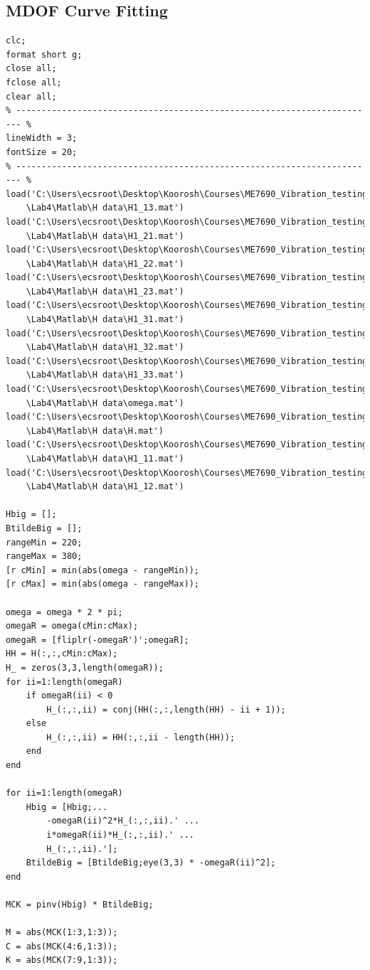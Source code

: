\documentclass[paper=a4, fontsize=12pt]{scrartcl} %
\begin{document}
\subsection*{MDOF Curve Fitting}
\begin{lstlisting}
clc;
format short g;
close all;
fclose all;
clear all;
% ----------------------------------------------------------------------- %
lineWidth = 3;
fontSize = 20;
% ----------------------------------------------------------------------- %
load('C:\Users\ecsroot\Desktop\Koorosh\Courses\ME7690_Vibration_testing
	\Lab4\Matlab\H data\H1_13.mat')
load('C:\Users\ecsroot\Desktop\Koorosh\Courses\ME7690_Vibration_testing
	\Lab4\Matlab\H data\H1_21.mat')
load('C:\Users\ecsroot\Desktop\Koorosh\Courses\ME7690_Vibration_testing
	\Lab4\Matlab\H data\H1_22.mat')
load('C:\Users\ecsroot\Desktop\Koorosh\Courses\ME7690_Vibration_testing
	\Lab4\Matlab\H data\H1_23.mat')
load('C:\Users\ecsroot\Desktop\Koorosh\Courses\ME7690_Vibration_testing
	\Lab4\Matlab\H data\H1_31.mat')
load('C:\Users\ecsroot\Desktop\Koorosh\Courses\ME7690_Vibration_testing
	\Lab4\Matlab\H data\H1_32.mat')
load('C:\Users\ecsroot\Desktop\Koorosh\Courses\ME7690_Vibration_testing
	\Lab4\Matlab\H data\H1_33.mat')
load('C:\Users\ecsroot\Desktop\Koorosh\Courses\ME7690_Vibration_testing
	\Lab4\Matlab\H data\omega.mat')
load('C:\Users\ecsroot\Desktop\Koorosh\Courses\ME7690_Vibration_testing
	\Lab4\Matlab\H data\H.mat')
load('C:\Users\ecsroot\Desktop\Koorosh\Courses\ME7690_Vibration_testing
	\Lab4\Matlab\H data\H1_11.mat')
load('C:\Users\ecsroot\Desktop\Koorosh\Courses\ME7690_Vibration_testing
	\Lab4\Matlab\H data\H1_12.mat')

Hbig = [];
BtildeBig = [];
rangeMin = 220;
rangeMax = 380;
[r cMin] = min(abs(omega - rangeMin));
[r cMax] = min(abs(omega - rangeMax));

omega = omega * 2 * pi;
omegaR = omega(cMin:cMax);
omegaR = [fliplr(-omegaR')';omegaR];
HH = H(:,:,cMin:cMax);
H_ = zeros(3,3,length(omegaR));
for ii=1:length(omegaR)
    if omegaR(ii) < 0
        H_(:,:,ii) = conj(HH(:,:,length(HH) - ii + 1));
    else
        H_(:,:,ii) = HH(:,:,ii - length(HH));
    end
end

for ii=1:length(omegaR)
	Hbig = [Hbig;...
        -omegaR(ii)^2*H_(:,:,ii).' ...
        i*omegaR(ii)*H_(:,:,ii).' ...
        H_(:,:,ii).'];
    BtildeBig = [BtildeBig;eye(3,3) * -omegaR(ii)^2];
end

MCK = pinv(Hbig) * BtildeBig;

M = abs(MCK(1:3,1:3));
C = abs(MCK(4:6,1:3));
K = abs(MCK(7:9,1:3));
\end{lstlisting}
\end{document}
